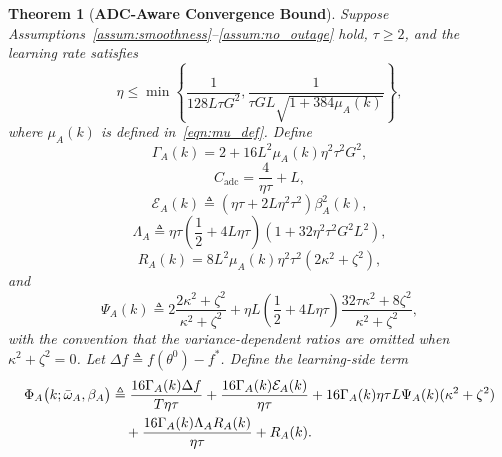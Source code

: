 \documentclass[conference]{IEEEtran}
\newtheorem{theorem}{Theorem}
\begin{document}
\begin{theorem}[\bf ADC-Aware Convergence Bound]
    \label{thm:main_convergence}
    Suppose Assumptions~\ref{assum:smoothness}--\ref{assum:no_outage} hold, $\tau\ge2$, and the learning rate satisfies
    \begin{equation}
        \label{eqn:lr_condition_new}
        \eta
        \le
        \min\left\{
            \frac{1}{128L\tau G^2},
            \frac{1}{\tau GL\sqrt{1+384\mu_A(k)}}
        \right\},
    \end{equation}
    where $\mu_A(k)$ is defined in~\eqref{eqn:mu_def}. Define
    \begin{equation}
        \Gamma_A(k)=2+16L^2\mu_A(k)\eta^2\tau^2G^2,
    \end{equation}
    \begin{equation}
        C_{\mathrm{adc}}=\frac{4}{\eta\tau}+L,
    \end{equation}
    \begin{equation}
        \mathcal{E}_A(k)
        \triangleq
        (\eta\tau+2L\eta^2\tau^2)\beta_A^2(k),
    \end{equation}
    \begin{equation}
        \Lambda_A
        \triangleq
        \eta\tau\left(\frac12+4L\eta\tau\right)
        \left(1+32\eta^2\tau^2G^2L^2\right),
    \end{equation}
    \begin{equation}
        R_A(k)=8L^2\mu_A(k)\eta^2\tau^2(2\kappa^2+\zeta^2),
    \end{equation}
    and
    \begin{equation}
        \Psi_A(k)
        \triangleq
        2\frac{2\kappa^2+\zeta^2}{\kappa^2+\zeta^2}
        +\eta L\left(\frac12+4L\eta\tau\right)
        \frac{32\tau\kappa^2+8\zeta^2}{\kappa^2+\zeta^2},
    \end{equation}
    with the convention that the variance-dependent ratios are omitted when $\kappa^2+\zeta^2=0$. Let $\Delta f\triangleq f(\theta^0)-f^*$. Define the learning-side term
    \begin{align}
        \label{eqn:phi_def_theorem}
        \Phi_A\big(k;\bar{\omega}_A,\beta_A\big)
        &\triangleq
        \frac{16\Gamma_A(k)\Delta f}{T\eta\tau}
        +\frac{16\Gamma_A(k)\mathcal{E}_A(k)}{\eta\tau}
        +16\Gamma_A(k)\eta\tau L\Psi_A(k)(\kappa^2+\zeta^2)
        \notag\\
        &\quad+
        \frac{16\Gamma_A(k)\Lambda_AR_A(k)}{\eta\tau}
        +R_A(k).
    \end{align}

\end{theorem}
\end{document}

